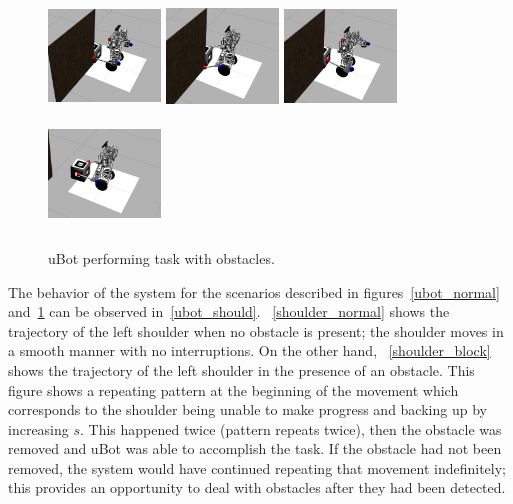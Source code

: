 \documentclass[a4paper]{article}
\begin{document}
\begin{figure}[!htb]
  \includegraphics[width=30mm, height=30mm]{block11.png}
  \label{block1}
\endminipage\hfill
{}
  \includegraphics[width=30mm, height=30mm]{block31.png}
  \label{block2}
\endminipage\hfill
{}%
  \includegraphics[width=30mm, height=30mm]{block41.png}
  \label{block3}
\endminipage\hfill
{}%
  \includegraphics[width=30mm, height=30mm]{block51.png}
  \label{block4}
\endminipage
\caption{uBot performing task with obstacles.}
\label{ubot_obstacle}
\end{figure}

The behavior of the system for the scenarios described in figures~\ref{ubot_normal} and~\ref{ubot_obstacle} can be observed in~\ref{ubot_should}. ~\ref{shoulder_normal} shows the trajectory of the left shoulder when no obstacle is present; the shoulder moves in a smooth manner with no interruptions. On the other hand, ~\ref{shoulder_block} shows the trajectory of the left shoulder in the presence of an obstacle. This figure shows a repeating pattern at the beginning of the movement which corresponds to the shoulder being unable to make progress and backing up by increasing $s$. This happened twice (pattern repeats twice), then the obstacle was removed and uBot was able to accomplish the task. If the obstacle had not been removed, the system would have continued repeating that movement indefinitely; this provides an opportunity to deal with obstacles after they had been detected.        
\end{document}
